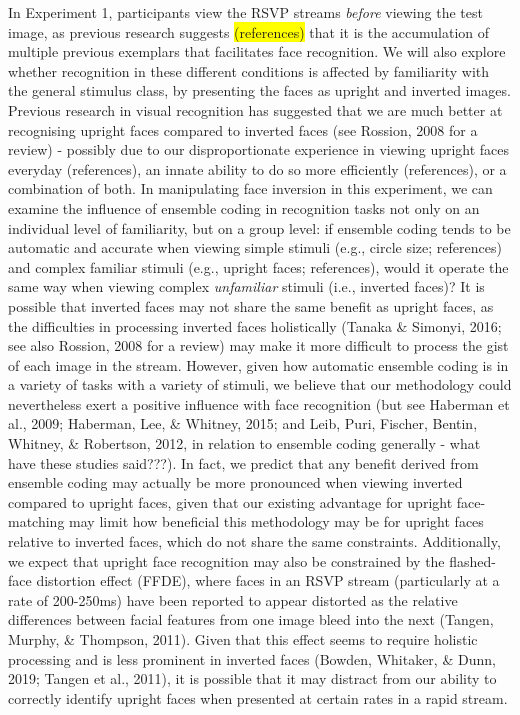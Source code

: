 \documentclass[
  english,
  man]{apa6}
\begin{document}
In Experiment 1, participants view the RSVP streams \emph{before} viewing the test image, as previous research suggests \colorbox{yellow}{(references)} that it is the accumulation of multiple previous exemplars that facilitates face recognition. We will also explore whether recognition in these different conditions is affected by familiarity with the general stimulus class, by presenting the faces as upright and inverted images. Previous research in visual recognition has suggested that we are much better at recognising upright faces compared to inverted faces (see Rossion, 2008 for a review) - possibly due to our disproportionate experience in viewing upright faces everyday (references), an innate ability to do so more efficiently (references), or a combination of both. In manipulating face inversion in this experiment, we can examine the influence of ensemble coding in recognition tasks not only on an individual level of familiarity, but on a group level: if ensemble coding tends to be automatic and accurate when viewing simple stimuli (e.g., circle size; references) and complex familiar stimuli (e.g., upright faces; references), would it operate the same way when viewing complex \emph{unfamiliar} stimuli (i.e., inverted faces)? It is possible that inverted faces may not share the same benefit as upright faces, as the difficulties in processing inverted faces holistically (Tanaka \& Simonyi, 2016; see also Rossion, 2008 for a review) may make it more difficult to process the gist of each image in the stream. However, given how automatic ensemble coding is in a variety of tasks with a variety of stimuli, we believe that our methodology could nevertheless exert a positive influence with face recognition (but see Haberman et al., 2009; Haberman, Lee, \& Whitney, 2015; and Leib, Puri, Fischer, Bentin, Whitney, \& Robertson, 2012, in relation to ensemble coding generally - what have these studies said???). In fact, we predict that any benefit derived from ensemble coding may actually be more pronounced when viewing inverted compared to upright faces, given that our existing advantage for upright face-matching may limit how beneficial this methodology may be for upright faces relative to inverted faces, which do not share the same constraints. Additionally, we expect that upright face recognition may also be constrained by the flashed-face distortion effect (FFDE), where faces in an RSVP stream (particularly at a rate of 200-250ms) have been reported to appear distorted as the relative differences between facial features from one image bleed into the next (Tangen, Murphy, \& Thompson, 2011). Given that this effect seems to require holistic processing and is less prominent in inverted faces (Bowden, Whitaker, \& Dunn, 2019; Tangen et al., 2011), it is possible that it may distract from our ability to correctly identify upright faces when presented at certain rates in a rapid stream.
\end{document}
